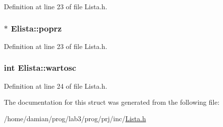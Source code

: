 Definition at line 23 of file Lista.\-h.

\hypertarget{struct_elista_aa4bfee465e1ea4484c9aeddc2437e532}{
\subsubsection[{poprz}]{ $\ast$ Elista\-::poprz}}\label{struct_elista_aa4bfee465e1ea4484c9aeddc2437e532}


Definition at line 23 of file Lista.\-h.

\hypertarget{struct_elista_a8de211523404f6484098bc85dd1ce52b}{
\subsubsection[{wartosc}]{\setlength{\rightskip}{0pt plus 5cm}int Elista\-::wartosc}}\label{struct_elista_a8de211523404f6484098bc85dd1ce52b}


Definition at line 24 of file Lista.\-h.



The documentation for this struct was generated from the following file\-:\begin{DoxyCompactItemize}
\item 
/home/damian/prog/lab3/prog/prj/inc/\hyperlink{_lista_8h}{Lista.\-h}\end{DoxyCompactItemize}
